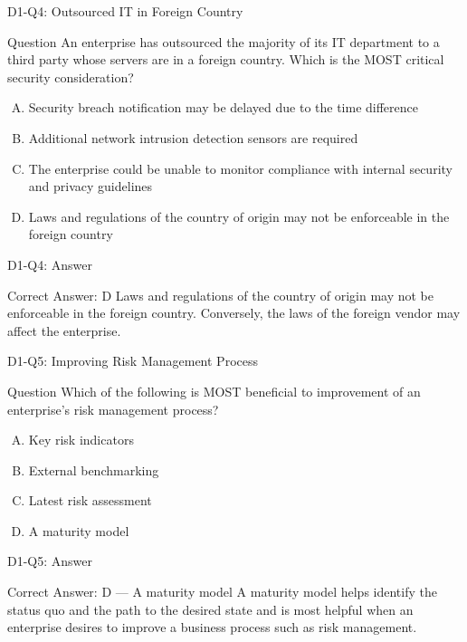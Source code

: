 \documentclass{beamer}
\begin{document}
	\begin{frame}{D1-Q4: Outsourced IT in Foreign Country}
		\begin{block}{Question}
			An enterprise has outsourced the majority of its IT department to a third party whose servers are in a foreign country. Which is the MOST critical security consideration?
		\end{block}
		\begin{enumerate}[(A)]
			\item Security breach notification may be delayed due to the time difference
			\item Additional network intrusion detection sensors are required
			\item The enterprise could be unable to monitor compliance with internal security and privacy guidelines
			\item Laws and regulations of the country of origin may not be enforceable in the foreign country
		\end{enumerate}
	\end{frame}
	\begin{frame}{D1-Q4: Answer}
		\begin{block}{Correct Answer: D}
			Laws and regulations of the country of origin may not be enforceable in the foreign country. Conversely, the laws of the foreign vendor may affect the enterprise.
		\end{block}
	\end{frame}
	
	\begin{frame}{D1-Q5: Improving Risk Management Process}
		\begin{block}{Question}
			Which of the following is MOST beneficial to improvement of an enterprise's risk management process?
		\end{block}
		\begin{enumerate}[(A)]
			\item Key risk indicators
			\item External benchmarking
			\item Latest risk assessment
			\item A maturity model
		\end{enumerate}
	\end{frame}
	\begin{frame}{D1-Q5: Answer}
		\begin{block}{Correct Answer: D --- A maturity model}
			A maturity model helps identify the status quo and the path to the desired state and is most helpful when an enterprise desires to improve a business process such as risk management.
		\end{block}
	\end{frame}
	
\end{document}
